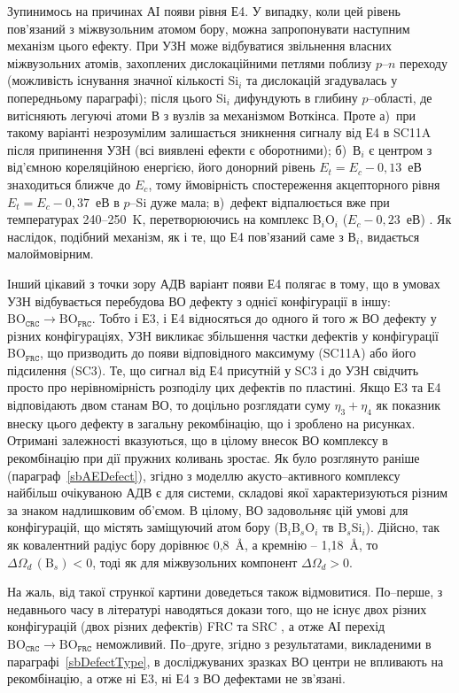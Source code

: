 Зупинимось на причинах АІ появи рівня Е4.
У випадку, коли цей рівень пов'язаний з міжвузольним атомом бору, можна запропонувати наступним механізм цього ефекту.
При УЗН може відбуватися звільнення власних міжвузольних атомів, захоплених дислокаційними петлями поблизу $p$--$n$ переходу (можливість існування значної кількості Si$_i$ та дислокацій згадувалась у попередньому параграфі);
після цього Si$_i$ дифундують в глибину $p$--області, де витісняють легуючі атоми В з вузлів за механізмом Воткінса.
Проте
а)~при такому варіанті незрозумілим залишається зникнення сигналу від Е4 в SC11A після припинення УЗН (всі виявлені ефекти є оборотними);
б)~В$_i$ є центром з від'ємною кореляційною енергією, його донорний рівень $E_t=E_c-0,13$~еВ \cite{Bi:Harris} знаходиться ближче до $E_c$, тому ймовірність спостереження акцепторного рівня
$E_t=E_c-0,37$~еВ в $p$--Si дуже мала;
в)~дефект відпалюється вже при температурах 240--250~K, перетворюючись на комплекс B$_i$O$_i$ ($E_c-0,23$~еВ) \cite{PhysRevB94}.
Як наслідок, подібний механізм, як і те, що Е4 пов'язаний саме з В$_i$, видається малоймовірним.

Інший цікавий з точки зору АДВ варіант появи Е4 полягає в тому, що в умовах УЗН відбувається
перебудова ВО дефекту з однієї конфігурації в іншу: $\mbox{BO}_\mathtt{CRC} \rightarrow \mbox{BO}_\mathtt{FRC}$.
Тобто і Е3, і Е4 відносяться до одного й того ж ВО дефекту у різних конфігураціях,
УЗН викликає збільшення частки дефектів у конфігурації  BO$_\mathtt{FRC}$, що призводить до появи відповідного максимуму (SC11A) або його підсилення (SC3).
Те, що сигнал від Е4 присутній у SC3 і до УЗН свідчить просто про нерівномірність розподілу цих дефектів по пластині.
Якщо Е3 та Е4 відповідають двом станам ВО, то доцільно розглядати суму $\eta_3+\eta_4$ як показник внеску цього дефекту в загальну рекомбінацію, що і зроблено на рисунках.
Отримані залежності вказуються, що в цілому внесок ВО комплексу в рекомбінацію при дії пружних коливань зростає.
Як було розглянуто раніше (параграф~\ref{sbAEDefect}), згідно з моделлю акусто--активного комплексу найбільш очікуваною АДВ є для системи, складові якої характеризуються різним за знаком надлишковим об'ємом.
В цілому, ВО задовольняє цій умові для конфігурацій, що містять заміщуючий атом бору (B$_i$B$_s$O$_i$ тв B$_s$Si$_i$).
Дійсно, так як ковалентний радіус бору дорівнює 0,8~{\AA}, а кремнію -- 1,18~{\AA},
то $\Delta\Omega_d\,(\mbox{B}_s)<0$,
тоді як для міжвузольних компонент $\Delta\Omega_d>0$.

На жаль, від такої стрункої картини доведеться також відмовитися.
По--перше, з недавнього часу в літературі наводяться докази того, що не існує двох
різних конфігурацій  (двох різних дефектів) FRC та SRC \cite{BOSingle:Voronkov,BO3i,BOSingle:SEMSS2017,Kim},
а отже АІ перехід $\mbox{BO}_\mathtt{CRC} \rightarrow \mbox{BO}_\mathtt{FRC}$ неможливий.
По--друге, згідно з результатами, викладеними в параграфі~\ref{sbDefectType},
в досліджуваних зразках ВО центри не впливають на рекомбінацію,
а отже ні Е3, ні Е4 з ВО дефектами не зв'язані.


